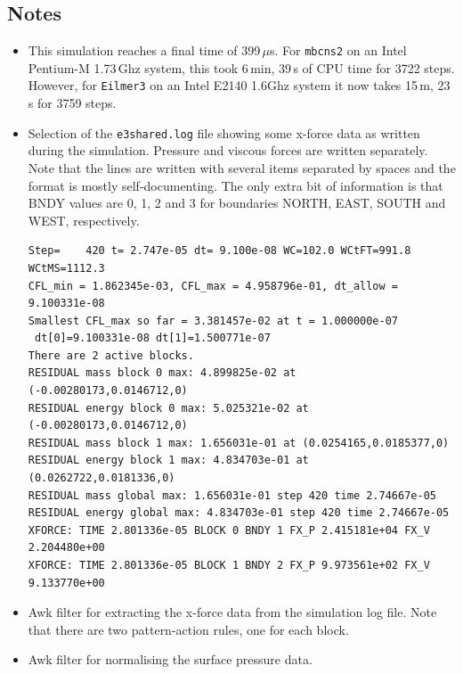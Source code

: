 \subsection{Notes}
\begin{itemize}
\item This simulation reaches a final time of 399\,$\mu$s.
      For \texttt{mbcns2} on an Intel Pentium-M 1.73\,Ghz system, this took 6\,min, 39\,s of CPU time
      for 3722 steps.
      However, for \texttt{Eilmer3} on an Intel E2140 1.6Ghz system it now takes 15\,m, 23\,s
      for 3759 steps.
\item Selection of the \texttt{e3shared.log} file showing some x-force data
      as written during the simulation.
      Pressure and viscous forces are written separately.
      Note that the lines are written with several items separated by spaces and the
      format is mostly self-documenting.
      The only extra bit of information is that BNDY values are 0, 1, 2 and 3 for
      boundaries NORTH, EAST, SOUTH and WEST, respectively.
\footnotesize
\begin{verbatim}
Step=    420 t= 2.747e-05 dt= 9.100e-08 WC=102.0 WCtFT=991.8 WCtMS=1112.3
CFL_min = 1.862345e-03, CFL_max = 4.958796e-01, dt_allow = 9.100331e-08
Smallest CFL_max so far = 3.381457e-02 at t = 1.000000e-07
 dt[0]=9.100331e-08 dt[1]=1.500771e-07
There are 2 active blocks.
RESIDUAL mass block 0 max: 4.899825e-02 at (-0.00280173,0.0146712,0)
RESIDUAL energy block 0 max: 5.025321e-02 at (-0.00280173,0.0146712,0)
RESIDUAL mass block 1 max: 1.656031e-01 at (0.0254165,0.0185377,0)
RESIDUAL energy block 1 max: 4.834703e-01 at (0.0262722,0.0181336,0)
RESIDUAL mass global max: 1.656031e-01 step 420 time 2.74667e-05
RESIDUAL energy global max: 4.834703e-01 step 420 time 2.74667e-05
XFORCE: TIME 2.801336e-05 BLOCK 0 BNDY 1 FX_P 2.415181e+04 FX_V 2.204480e+00 
XFORCE: TIME 2.801336e-05 BLOCK 1 BNDY 2 FX_P 9.973561e+02 FX_V 9.133770e+00 
\end{verbatim}
\normalsize

\item Awk filter for extracting the x-force data from the simulation log file.
      Note that there are two pattern-action rules, one for each block.
      
\item Awk filter for normalising the surface pressure data.
      
\end{itemize}
